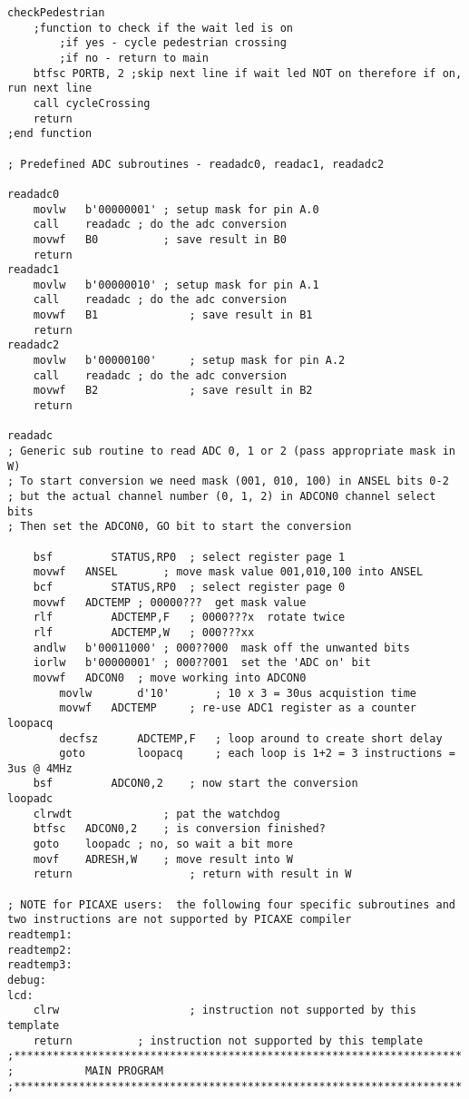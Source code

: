 \begin{lstlisting}[language={[x86masm]Assembler}, style=assembly, caption=Full code listing]
checkPedestrian
	;function to check if the wait led is on
		;if yes - cycle pedestrian crossing
		;if no - return to main 
	btfsc PORTB, 2 ;skip next line if wait led NOT on therefore if on, run next line
	call cycleCrossing
	return
;end function

; Predefined ADC subroutines - readadc0, readac1, readadc2

readadc0
	movlw	b'00000001'	; setup mask for pin A.0
	call	readadc	; do the adc conversion
	movwf	B0         	; save result in B0
	return
readadc1
	movlw	b'00000010'	; setup mask for pin A.1
	call	readadc	; do the adc conversion
	movwf	B1          	; save result in B1
	return
readadc2
	movlw	b'00000100' 	; setup mask for pin A.2
	call	readadc	; do the adc conversion
	movwf	B2          	; save result in B2
	return

readadc
; Generic sub routine to read ADC 0, 1 or 2 (pass appropriate mask in W)
; To start conversion we need mask (001, 010, 100) in ANSEL bits 0-2
; but the actual channel number (0, 1, 2) in ADCON0 channel select bits
; Then set the ADCON0, GO bit to start the conversion

	bsf     	STATUS,RP0	; select register page 1
	movwf	ANSEL		; move mask value 001,010,100 into ANSEL
	bcf     	STATUS,RP0	; select register page 0
	movwf	ADCTEMP	; 00000??? 	get mask value
	rlf     	ADCTEMP,F	; 0000???x	rotate twice
	rlf     	ADCTEMP,W	; 000???xx
	andlw	b'00011000'	; 000??000	mask off the unwanted bits
	iorlw	b'00000001'	; 000??001	set the 'ADC on' bit	 
	movwf	ADCON0	; move working into ADCON0
    	movlw   	d'10'      	; 10 x 3 = 30us acquistion time
    	movwf   ADCTEMP    	; re-use ADC1 register as a counter
loopacq
    	decfsz  	ADCTEMP,F  	; loop around to create short delay
    	goto    	loopacq    	; each loop is 1+2 = 3 instructions = 3us @ 4MHz
	bsf     	ADCON0,2	; now start the conversion
loopadc
	clrwdt      		; pat the watchdog
	btfsc	ADCON0,2	; is conversion finished?
	goto	loopadc	; no, so wait a bit more
	movf	ADRESH,W	; move result into W
	return          		; return with result in W

; NOTE for PICAXE users:  the following four specific subroutines and two instructions are not supported by PICAXE compiler
readtemp1:
readtemp2:
readtemp3:
debug:
lcd:
	clrw               		; instruction not supported by this template
	return			; instruction not supported by this template
;*********************************************************************
;			MAIN PROGRAM
;*********************************************************************


\end{lstlisting}
